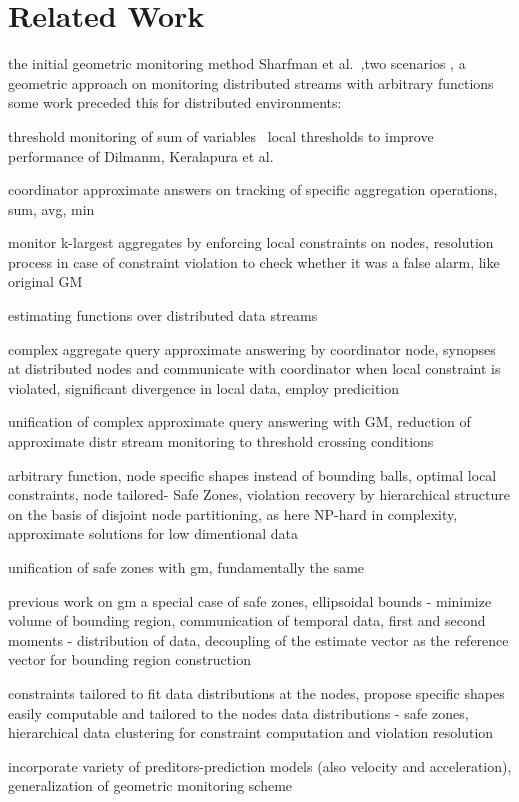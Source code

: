 \chapter{Related Work} \label{chap:relWork}

the initial geometric monitoring method Sharfman et al.~\cite{Sharfman2006GM},two scenarios , a geometric approach on monitoring distributed streams with arbitrary functions
some work preceded this for distributed environments:

threshold monitoring of sum of variables~\cite{DilmanReactiveMonitoring}
local thresholds to improve performance of Dilmanm, Keralapura et al.~\cite{KeralapuraCommEfficientThresholdCounts}

coordinator approximate answers on tracking of specific aggregation operations, sum, avg, min\cite{OlstonAdaptiveFiltersContQueries}

monitor k-largest aggregates by enforcing local constraints on nodes, 
resolution process in case of constraint violation to check whether it was a false alarm, like original GM~\cite{BabcockDistributedTopk}

estimating functions over distributed data streams~\cite{GibbonsSimpleFuncEstimationOverUnion, GibbonsDistrStreamAlgosSlidingWindows}

complex aggregate query approximate answering by coordinator node, synopses at distributed nodes and communicate with coordinator when local constraint is violated, significant divergence in local data, employ predicition~\cite{CormodeApproxContQueryingDistrStreams}

unification of complex approximate query answering with GM, reduction of approximate distr stream monitoring to threshold crossing conditions~\cite{Garofalakis2013SketchBasedGM}

arbitrary function, node specific shapes instead of bounding balls, optimal local constraints, node tailored- Safe Zones, violation recovery by hierarchical structure on the basis of disjoint node partitioning, as here
NP-hard in complexity, approximate solutions for low dimentional data~\cite{Keren2013SafeZones}

unification of safe zones with gm, fundamentally the same~\cite{Samoladas2013Unification}

previous work on gm a special case of safe zones, ellipsoidal bounds - minimize volume of bounding region, communication of temporal data, first and second moments - distribution of data, decoupling of the estimate vector as the reference vector for bounding region construction~\cite{Sharfman2012ShapeSensGM}

constraints tailored to fit data distributions at the nodes, propose specific shapes easily computable and tailored to the nodes data distributions - safe zones, hierarchical data clustering for constraint computation and violation resolution~\cite{Keren2014GMHetStreams}

incorporate variety of preditors-prediction models (also velocity and acceleration), generalization of geometric monitoring scheme~\cite{GiatrakosPredictionGM}
